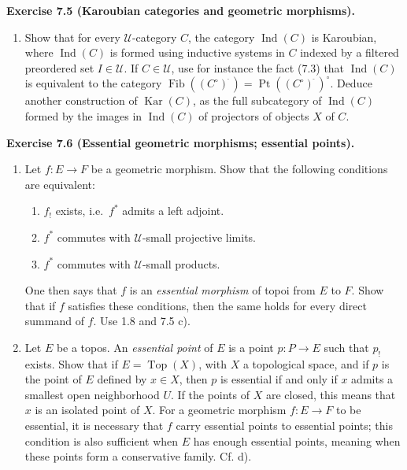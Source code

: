 \documentclass[11pt]{article}
\newcommand{\U}{\mathcal{U}}
\newcommand{\Top}{\operatorname{Top}}
\newcommand{\Ind}{\operatorname{Ind}}
\newcommand{\kar}{\operatorname{Kar}}
\newcommand{\Ppoint}{\operatorname{Pt}}
\newcommand{\Ffib}{\operatorname{Fib}}
\newcommand{\ie}{i.e.}
\newenvironment{remarktext}[1]{\par\medskip\noindent\textbf{#1.}\ }{\par\medskip}
\begin{document}
\begin{remarktext}{Exercise 7.5 (Karoubian categories and geometric morphisms)}
\begin{enumerate}[label=\alph*)]
\item Show that for every \(\U\)-category \(C\), the category \(\Ind(C)\) is Karoubian, where \(\Ind(C)\) is formed using inductive systems in \(C\) indexed by a filtered preordered set \(I\in\U\). If \(C\in\U\), use for instance the fact (7.3) that \(\Ind(C)\) is equivalent to the category \(\Ffib((C^\circ)^{\widehat{\phantom{,}}})=\Ppoint((C^\circ)^{\widehat{\phantom{,}}})^\circ\). Deduce another construction of \(\kar(C)\), as the full subcategory of \(\Ind(C)\) formed by the images in \(\Ind(C)\) of projectors of objects \(X\) of \(C\).
\end{enumerate}
\end{remarktext}

\begin{remarktext}{Exercise 7.6 (Essential geometric morphisms; essential points)}
\begin{enumerate}[label=\alph*)]
\item Let \(f:E\to F\) be a geometric morphism. Show that the following conditions are equivalent:
\begin{enumerate}[label=(\roman*)]
\item \(f_!\) exists, \ie\ \(f^*\) admits a left adjoint.
\item \(f^*\) commutes with \(\U\)-small projective limits.
\item \(f^*\) commutes with \(\U\)-small products.
\end{enumerate}
One then says that \(f\) is an \emph{essential morphism} of topoi from \(E\) to \(F\). Show that if \(f\) satisfies these conditions, then the same holds for every direct summand of \(f\). Use 1.8 and 7.5 c).

\item Let \(E\) be a topos. An \emph{essential point} of \(E\) is a point \(p:P\to E\) such that \(p_!\) exists. Show that if \(E=\Top(X)\), with \(X\) a topological space, and if \(p\) is the point of \(E\) defined by \(x\in X\), then \(p\) is essential if and only if \(x\) admits a smallest open neighborhood \(U\). If the points of \(X\) are closed, this means that \(x\) is an isolated point of \(X\). For a geometric morphism \(f:E\to F\) to be essential, it is necessary that \(f\) carry essential points to essential points; this condition is also sufficient when \(E\) has enough essential points, meaning when these points form a conservative family. Cf. d).


\end{enumerate}
\end{remarktext}
\end{document}

